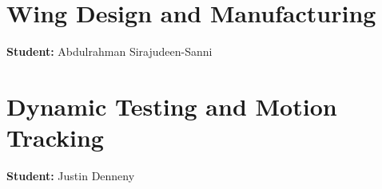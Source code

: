 \newpage
\section{Wing Design and Manufacturing}
\label{chap:Abdulrahman_Sirajudeen-Sanni}
\textbf{Student:} Abdulrahman Sirajudeen-Sanni 


\newpage
\section{Dynamic Testing and Motion Tracking}
\label{chap:Justin_Denneny}
\textbf{Student:} Justin Denneny

